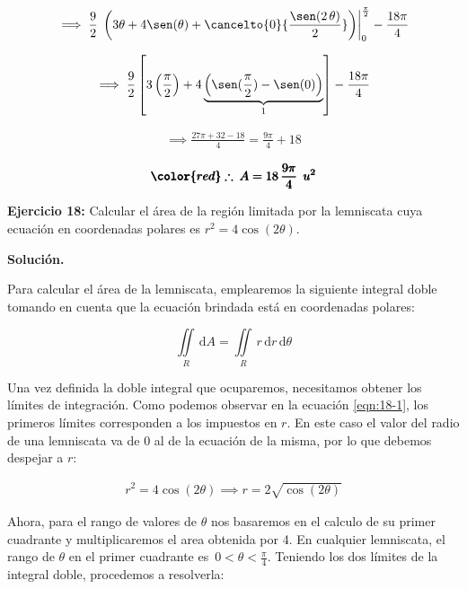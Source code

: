 \documentclass[12pt]{article}
\begin{document}
\begin{align*}
	\implies \frac{9}{2}\,\left.\left(3\theta+4\sen(\theta)+\cancelto{0}{\frac{\sen(2\,\theta)}{2}}\right)\right|_{0}^{\frac{\pi}{2}} - \frac{18\pi}{4}
\end{align*}

\begin{align*}
	\implies \frac{9}{2}\left[3\left(\frac{\pi}{2}\right) + 4\underbrace{\left(\sen(\frac{\pi}{2})-\sen(0)\right)}_{1} \right] - \frac{18\pi}{4}
\end{align*}

\begin{align*}
	\implies \frac{27\pi + 32 - 18}{4} = \frac{9\pi}{4} + 18
\end{align*}

\begin{align*}
	\pmb{\color{red} \therefore\: A = 18\,\frac{9\pi}{4}\: \: u^2}
\end{align*}

\noindent \textbf{Ejercicio 18:} Calcular el área de la región limitada por la lemniscata cuya ecuación en coordenadas polares es $r^2=4\cos(2\theta)$.

\vspace{5mm}

\noindent \textbf{Solución.}

\vspace{3mm}

\noindent Para calcular el área de la lemniscata, emplearemos la siguiente integral doble tomando en cuenta que la ecuación brindada está en coordenadas polares:

\begin{equation}\label{eqn:18-1}\tag{1}
	\iint\limits_R\, \mathrm{d}A = \iint\limits_R\, r\,\mathrm{d}r\,\mathrm{d}\theta
\end{equation}

\noindent Una vez definida la doble integral que ocuparemos, necesitamos obtener los límites de integración. Como podemos observar en la ecuación \eqref{eqn:18-1}, los primeros límites corresponden a los impuestos en $r$. En este caso el valor del radio de una lemniscata va de $0$ al de la ecuación de la misma, por lo que debemos despejar a $r$:

\begin{align*}
	r^2 = 4\cos(2\theta) \implies r = 2\sqrt{\cos(2\theta)}
\end{align*}

\noindent Ahora, para el rango de valores de $\theta$ nos basaremos en el calculo de su primer cuadrante y multiplicaremos el area obtenida por 4. En cualquier lemniscata, el rango de $\theta$ en el primer cuadrante es $\,0<\theta<\frac{\pi}{4}$. Teniendo los dos límites de la integral doble, procedemos a resolverla:
\end{document}
